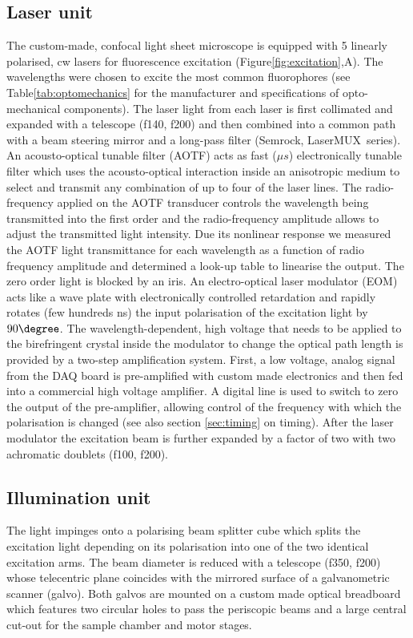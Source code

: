 \documentclass[12pt]{spieman}  %
\begin{document}
\subsection{Laser unit}		
The custom-made, confocal light sheet microscope is equipped with 5 linearly polarised, cw lasers for fluorescence excitation (Figure\ref{fig:excitation},A). The wavelengths were chosen to excite the most common fluorophores (see Table\ref{tab:optomechanics} for the manufacturer and specifications of opto-mechanical components). The laser light from each laser is first collimated and expanded with a telescope (f140, f200) and then combined into a common path with a beam steering mirror and a long-pass filter (Semrock, LaserMUX\texttrademark\ series). An acousto-optical tunable filter (AOTF) acts as fast ($\mu s$) electronically tunable filter which uses the acousto-optical interaction inside an anisotropic medium to select and transmit any combination of up to four of the laser lines. The radio-frequency applied on the AOTF transducer controls the wavelength being transmitted into the first order and the radio-frequency amplitude allows to adjust the transmitted light intensity. Due its nonlinear response we measured the AOTF light transmittance for each wavelength as a function of radio frequency amplitude and determined a look-up table to linearise the output. The zero order light is blocked by an iris. An electro-optical laser modulator (EOM) acts like a wave plate with electronically controlled retardation and rapidly rotates (few hundreds ns) the input polarisation of the excitation light by $90\degree$. The wavelength-dependent, high voltage that needs to be applied to the birefringent crystal inside the modulator to change the optical path length is provided by a two-step amplification system. First, a low voltage, analog signal from the DAQ board is pre-amplified with custom made electronics and then fed into a commercial high voltage amplifier. A digital line is used to switch to zero the output of the pre-amplifier, allowing control of the frequency with which the polarisation is changed (see also section \ref{sec:timing} on timing). After the laser modulator the excitation beam is further expanded by a factor of two with two achromatic doublets (f100, f200). 

\subsection{Illumination unit}		
The light impinges onto a polarising beam splitter cube which splits the excitation light depending on its polarisation into one of the two identical excitation arms. The beam diameter is reduced with a telescope (f350, f200) whose telecentric plane coincides with the mirrored surface of a galvanometric scanner (galvo). Both galvos are mounted on a custom made optical breadboard which features two circular holes to pass the periscopic beams and a large central cut-out for the sample chamber and motor stages. 
\end{document}
